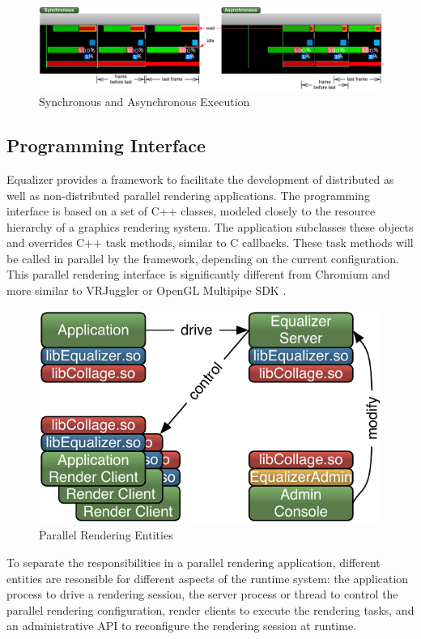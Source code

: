 \begin{figure}[ht!]\center
 \includegraphics[width=\textwidth]{images/syncAsync}
 {\caption{\label{fSyncAsync}Synchronous and Asynchronous Execution}}
\end{figure}


\subsection{Programming Interface}

Equalizer provides a framework to facilitate the development of distributed as
well as non-distributed parallel rendering applications. The programming
interface is based on a set of C++ classes, modeled closely to the resource
hierarchy of a graphics rendering system. The application subclasses these
objects and overrides C++ task methods, similar to C callbacks. These task
methods will be called in parallel by the framework, depending on the current
configuration. This parallel rendering interface is significantly different from
Chromium \cite{HHNFAKK:02} and more similar to VRJuggler \cite{BJHMBC:01} or
OpenGL Multipipe SDK \cite{BRE:05}.

\begin{figure}
 \includegraphics[width=.618\textwidth]{images/processes}
 {\caption{\label{fProcessing}Parallel Rendering Entities}}
\end{figure}

To separate the responsibilities in a parallel rendering application, different
entities are resonsible for different aspects of the runtime system: the
application process to drive a rendering session, the server process or thread
to control the parallel rendering configuration, render clients to execute the
rendering tasks, and an administrative API to reconfigure the rendering session
at runtime.

